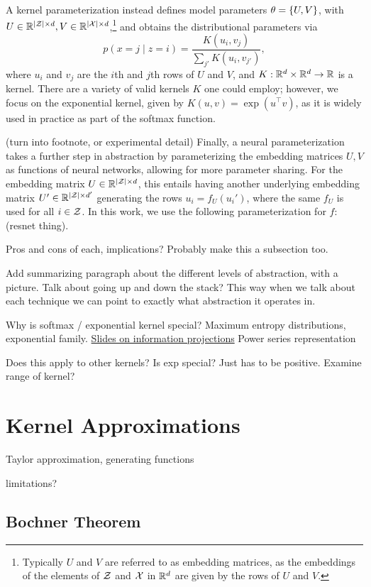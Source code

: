 \documentclass{article}
\begin{document}
A kernel parameterization instead defines model parameters $\theta = \left\{U,V\right\}$,
with $U\in\mathbb{R}^{|\mathcal{Z}|\times d},V\in\mathbb{R}^{|\mathcal{X}|\times d}$,\footnote{
Typically $U$ and $V$ are referred to as embedding matrices,
as the embeddings of the elements of $\mathcal{Z}$ and $\mathcal{X}$ in $\mathbb{R}^d$ are given by 
the rows of $U$ and $V$.
} and obtains the distributional
parameters via
$$p(x=j \mid z=i) = \frac{K(u_i, v_j)}{\sum_{j'} K(u_i, v_{j'})},$$
where $u_i$ and $v_j$ are the $i$th and $j$th rows of $U$ and $V$,
and $K: \mathbb{R}^d \times \mathbb{R}^d \to \mathbb{R}$ is a kernel.
There are a variety of valid kernels $K$ one could employ;
however, we focus on the exponential kernel, given by $K(u, v) = \exp(u^\top v)$,
as it is widely used in practice as part of the softmax function.

(turn into footnote, or experimental detail)
Finally, a neural parameterization takes a further step in abstraction by
parameterizing the embedding matrices $U,V$ as functions of neural networks,
allowing for more parameter sharing.
For the embedding matrix $U\in\mathbb{R}^{|\mathcal{Z}|\times d}$,
this entails having another underlying embedding matrix $U'\in\mathbb{R}^{|\mathcal{Z}| \times d'}$
generating the rows $u_i = f_U(u_i')$, where the same $f_U$ is used for all $i \in \mathcal{Z}$.
In this work, we use the following parameterization for $f$:
(resnet thing).

Pros and cons of each, implications?
Probably make this a subsection too.

Add summarizing paragraph about the different levels of abstraction, with a picture.
Talk about going up and down the stack?
This way when we talk about each technique we can point
to exactly what abstraction it operates in.

Why is softmax / exponential kernel special?
Maximum entropy distributions, exponential family.
\href{https://www.lix.polytechnique.fr/~nielsen/CIG-slides.pdf}{Slides on information projections}
Power series representation

Does this apply to other kernels? Is exp special? Just has to be positive.
Examine range of kernel?

\section{Kernel Approximations}
Taylor approximation, generating functions

limitations?
\subsection{Bochner Theorem}
\end{document}
